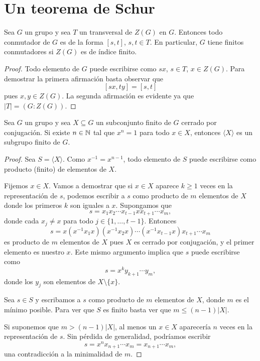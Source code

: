 \chapter{Un teorema de Schur}

\begin{lemma}
	\label{lemma:[s,t]} 
	Sea $G$ un grupo y sea $T$ un transversal de $Z(G)$ en
	$G$. Entonces todo conmutador de $G$ es de la forma $[s,t]$, $s,t\in T$. En
	particular, $G$ tiene finitos conmutadores si $Z(G)$ es de índice finito.
\end{lemma}

\begin{proof}
	Todo elemento de $G$ puede escribirse como $sx$, $s\in T$, $x\in
	Z(G)$. Para demostrar la primera afirmación basta observar que
	\[
		[sx,ty]=[s,t]
	\]
	pues $x,y\in Z(G)$. La segunda afirmación es evidente ya que
	$|T|=(G:Z(G))$.
\end{proof}

\begin{theorem}[Dietzmann]
	\label{theorem:Dietzmann} 
	Sea $G$ un grupo y sea $X\subseteq G$ un
	subconjunto finito de $G$ cerrado por conjugación. Si existe $n\in\mathbb{N}$ tal
	que $x^n=1$ para todo $x\in X$, entonces $\langle X\rangle$ es un subgrupo
	finito de $G$.
\end{theorem}

\begin{proof}
	Sea $S=\langle X\rangle$. Como $x^{-1}=x^{n-1}$, todo elemento de $S$ puede
	escribirse como producto (finito) de elementos de $X$. 
	
	Fijemos $x\in X$. Vamos a demostrar que si $x\in X$ aparece $k\geq 1$ veces
	en la representación de $s$, podemos escribir a $s$ como producto de $m$
	elementos de $X$ donde los primeros $k$ son iguales a $x$.  Supongamos que
	\[
	s=x_1x_2\cdots x_{t-1}xx_{t+1}\cdots x_m,
	\]
	donde cada $x_j\ne x$ para todo $j\in\{1,\dots,t-1\}$. Entonces
	\[
		s=x(x^{-1}x_1x)(x^{-1}x_2x)\cdots (x^{-1}x_{t-1}x)x_{t+1}\cdots x_m
	\]
	es producto de $m$ elementos de $X$ pues $X$ es cerrado por conjugación, y
	el primer elemento es nuestro $x$. Este mismo argumento implica que $s$
	puede escribirse como
	\[
		s=x^ky_{k+1}\cdots y_m,
	\]
	donde los $y_j$ son elementos de $X\setminus\{x\}$.

	Sea $s\in S$ y escribamos a $s$ como producto de $m$ elementos de $X$,
	donde $m$ es el mínimo posible.  Para ver que $S$ es finito basta ver que 
	$m\leq (n-1)|X|$. 
	
	Si suponemos que $m>(n-1)|X|$, 
	al menos un $x\in X$ aparecería $n$ veces en la
	representación de $s$. Sin pérdida de generalidad, podríamos escribir 
	\[
		s=x^nx_{n+1}\cdots x_m=x_{n+1}\cdots x_m,
	\]
	una contradicción a la minimalidad de $m$. 
\end{proof}

